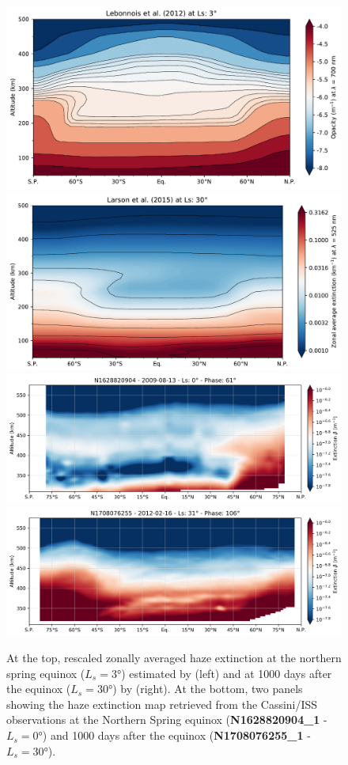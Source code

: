\begin{figure}[!ht]
    \centering
    \includegraphics[width=.47\textwidth]{Fig/Lebonnois2012_Fig4_equinox}
    \includegraphics[width=.47\textwidth]{Fig/Larson2015-Fig7_Spring}
    \includegraphics[width=.47\textwidth]{Fig/N1628820904_1-lat_beta.png}
    \includegraphics[width=.47\textwidth]{Fig/N1708076255_1-lat_beta.png}
    \caption{At the top, rescaled zonally averaged haze extinction at the northern spring equinox ($L_s = \ang{3}$)
        estimated by \cite{Lebonnois2012} (left) and at 1000 days after the equinox ($L_s = \ang{30}$)
        by \cite{Larson2015} (right).
        At the bottom, two panels showing the haze extinction map retrieved from the Cassini/ISS observations
        at the Northern Spring equinox (\textbf{N1628820904\_1} - $L_s = \ang{0}$) and 1000 days after the equinox
        (\textbf{N1708076255\_1} - $L_s = \ang{30}$).}
    \label{fig:gcm_spring}
\end{figure}


